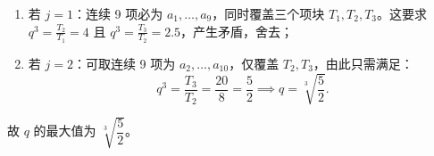 {  \begin{enumerate}[leftmargin=2em, label=(\arabic*), itemsep=0.3em, topsep=0.3em]
    \item 若 \(j = 1\)：连续 9 项必为 \(a_1, \dots, a_9\)，同时覆盖三个项块 \(T_1, T_2, T_3\)。这要求 \(q^3 = \frac{T_2}{T_1} = 4\) 且 \(q^3 = \frac{T_3}{T_2} = 2.5\)，产生矛盾，舍去；
    \item 若 \(j = 2\)：可取连续 9 项为 \(a_2, \dots, a_{10}\)，仅覆盖 \(T_2, T_3\)，由此只需满足：
      \[
        q^3 = \frac{T_3}{T_2} = \frac{20}{8} = \frac{5}{2} \implies q = \sqrt[3]{\frac{5}{2}}.
      \]
  \end{enumerate}

  故 \(q\) 的最大值为 \(\sqrt[3]{\dfrac{5}{2}}\)。%
}

\newcommand{\qSeqMaxRatioDiagnosis}{%
  这道数列压轴填空题难度极高。许多学生能推导出 \(q^3 = \dfrac{T_{j+1}}{T_j}\) 这一核心关系，并利用单调性发现最大值应该在 \(j=1\) 即 \(\sqrt[3]{4}\) 处产生，但却忽视了“连续 9 项”这一长度限制下，当选取 \(j=1\) 时必须强行涵盖 \(T_3\)，从而引发三块比例冲突的边界问题，从而落入陷阱。%
}

\newcommand{\qSeqMaxRatioTeachingNotes}{%
  本题为数列填空的巅峰之作。在教学讲评中，第一步应指导学生通过“新数列法”（将 3 项合并为一个大项 \(T_n\)）进行作差降维；第二步是重点：不仅要证明最大值在哪，更要通过“存在性验证”（回代具体的项区间如 \(a_2 \sim a_{10}\)）来检验边界条件。这能极大训练学生的逻辑严密性。%
}
